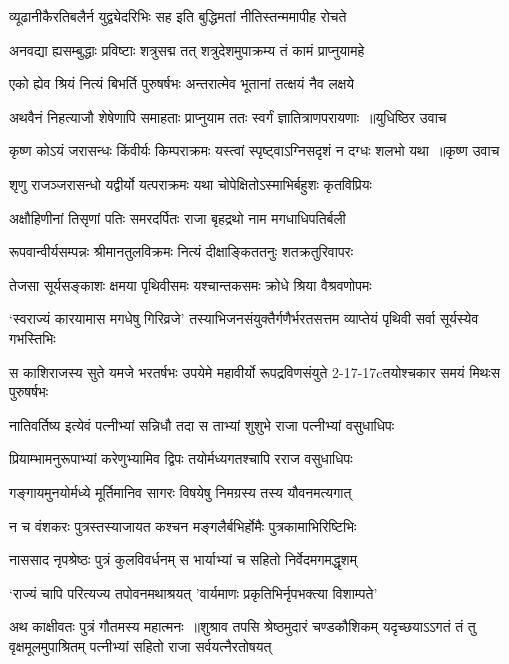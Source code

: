 \twolineshloka
{व्यूढानीकैरतिबलैर्न युद्व्येदरिभिः सह}
{इति बुद्धिमतां नीतिस्तन्ममापीह रोचते}


\twolineshloka
{अनवद्या ह्यसम्बुद्धाः प्रविष्टाः शत्रुसद्म तत्}
{शत्रुदेशमुपाक्रम्य तं कामं प्राप्नुयामहे}


\twolineshloka
{एको ह्येव श्रियं नित्यं बिभर्ति पुरुषर्षभः}
{अन्तरात्मेव भूतानां तत्क्षयं नैव लक्षये}


\twolineshloka
{अथवैनं निहत्याजौ शेषेणापि समाहताः}
{प्राप्नुयाम ततः स्वर्गं ज्ञातित्राणपरायणाः ॥युधिष्ठिर उवाच}


\twolineshloka
{कृष्ण कोऽयं जरासन्धः किंवीर्यः किम्पराक्रमः}
{यस्त्वां स्पृष्ट्वाऽग्निसदृशं न दग्धः शलभो यथा ॥कृष्ण उवाच}


\twolineshloka
{शृणु राजञ्जरासन्धो यद्वीर्यो यत्पराक्रमः}
{यथा चोपेक्षितोऽस्माभिर्बहुशः कृतविप्रियः}


\twolineshloka
{अक्षौहिणीनां तिसृणां पतिः समरदर्पितः}
{राजा बृहद्रथो नाम मगधाधिपतिर्बली}


\twolineshloka
{रूपवान्वीर्यसम्पन्नः श्रीमानतुलविक्रमः}
{नित्यं दीक्षाङ्किततनुः शतक्रतुरिवापरः}


\twolineshloka
{तेजसा सूर्यसङ्काशः क्षमया पृथिवीसमः}
{यश्चान्तकसमः क्रोधे श्रिया वैश्रवणोपमः}


\threelineshloka
{`स्वराज्यं कारयामास मगधेषु गिरिव्रजे'}
{तस्याभिजनसंयुक्तैर्गणैर्भरतसत्तम}
{व्याप्तेयं पृथिवी सर्वा सूर्यस्येव गभस्तिभिः}


\threelineshloka
{स काशिराजस्य सुते यमजे भरतर्षभः}
{उपयेमे महावीर्यो रूपद्रविणसंयुते}
{2-17-17cतयोश्चकार समयं मिथःस पुरुषर्षभः}


\twolineshloka
{नातिवर्तिष्य इत्येवं पत्नीभ्यां सन्निधौ तदा}
{स ताभ्यां शुशुभे राजा पत्नीभ्यां वसुधाधिपः}


\twolineshloka
{प्रियाम्भामनुरूपाभ्यां करेणुभ्यामिव द्विपः}
{तयोर्मध्यगतश्चापि रराज वसुधाधिपः}


\twolineshloka
{गङ्गायमुनयोर्मध्ये मूर्तिमानिव सागरः}
{विषयेषु निमग्रस्य तस्य यौवनमत्यगात्}


\twolineshloka
{न च वंशकरः पुत्रस्तस्याजायत कश्चन}
{मङ्गलैर्बभिर्होमैः पुत्रकामाभिरिष्टिभिः}


\twolineshloka
{नाससाद नृपश्रेष्ठः पुत्रं कुलविवर्धनम्}
{स भार्याभ्यां च सहितो निर्वेदमगमद्धृशम्}


\twolineshloka
{`राज्यं चापि परित्यज्य तपोवनमथाश्रयत्}
{'वार्यमाणः प्रकृतिभिर्नृपभक्त्या विशाम्पते'}


अथ काक्षीवतः पुत्रं गौतमस्य महात्मनः ॥शुश्राव तपसि श्रेष्ठमुदारं चण्डकौशिकम्
\twolineshloka
{यदृच्छयाऽऽगतं तं तु वृक्षमूलमुपाश्रितम्}
{पत्नीभ्यां सहितो राजा सर्वयत्नैरतोषयत्}


